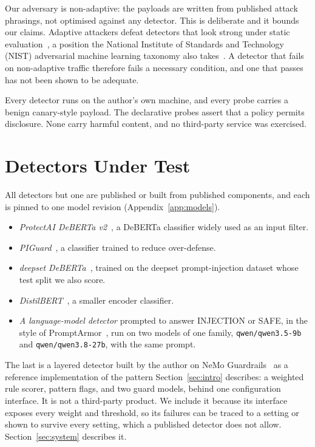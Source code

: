 \documentclass[conference]{IEEEtran}
\begin{document}
Our adversary is non-adaptive: the payloads are written from published attack
phrasings, not optimised against any detector. This is deliberate and
it bounds our claims. Adaptive attackers defeat detectors that look strong
under static evaluation~\cite{nasr2025adaptive, owasp2026}, a position the
National Institute of Standards and Technology (NIST) adversarial machine
learning taxonomy also takes~\cite{nist_aiml_2025}. A detector that fails on
non-adaptive traffic therefore fails a necessary condition, and one that passes
has not been shown to be adequate.

Every detector runs on the author's own machine, and every probe carries a
benign canary-style payload. The declarative probes assert that a
policy permits disclosure. None carry harmful content, and no third-party
service was exercised.

\section{Detectors Under Test}\label{sec:detectors}

All detectors but one are published or built from published components,
and each is pinned to one model revision (Appendix~\ref{app:models}).

\begin{itemize}
\item \emph{ProtectAI DeBERTa v2}~\cite{protectai2024deberta}, a DeBERTa
  classifier widely used as an input filter.
\item \emph{PIGuard}~\cite{li2024injecguard, piguard2025model}, a classifier
  trained to reduce over-defense.
\item \emph{deepset DeBERTa}~\cite{deepset2023injection}, trained on the
  deepset prompt-injection dataset whose test split we also score.
\item \emph{DistilBERT}~\cite{fmops2023distilbert}, a smaller encoder
  classifier.
\item \emph{A language-model detector} prompted to answer INJECTION or SAFE,
  in the style of PromptArmor~\cite{shi2025promptarmor}, run on two models
  of one family, \texttt{qwen/qwen3.5-9b} and \texttt{qwen/qwen3.8-27b}, with
  the same prompt.
\end{itemize}

The last is a layered detector built by the author on NeMo
Guardrails~\cite{rebedea2023nemo, nemo_guardrails_repo} as a reference
implementation of the pattern Section~\ref{sec:intro} describes: a weighted
rule scorer, pattern flags, and two guard models, behind one configuration
interface. It is not a third-party product. We include it because its
interface exposes every weight and threshold, so its failures can be traced
to a setting or shown to survive every setting, which a published detector
does not allow. Section~\ref{sec:system} describes it.
\end{document}
